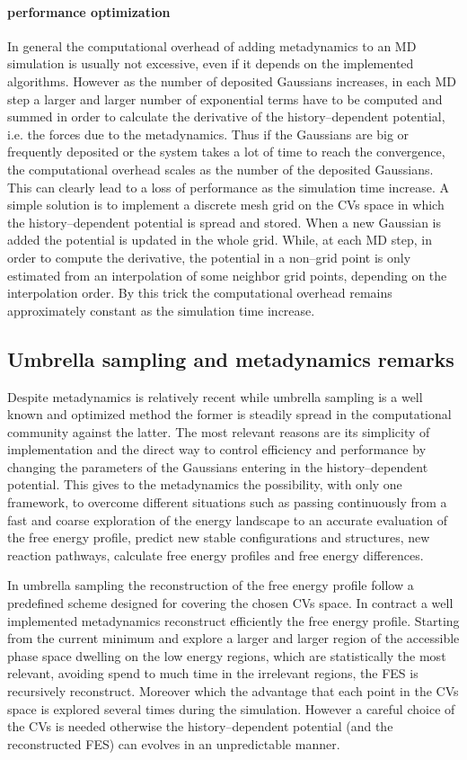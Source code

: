 \paragraph{\textbf{performance optimization}} In general the computational overhead of adding metadynamics to an 
\ac{MD} simulation is usually not excessive, even if it depends on the implemented algorithms. However as the 
number of deposited Gaussians increases, in each \ac{MD} step a larger and larger number of exponential terms 
have to be computed and summed in order to calculate the derivative of the history--dependent potential, i.e. the 
forces due to the metadynamics. Thus if the Gaussians are big or frequently deposited or the system takes a lot 
of time to reach the convergence, the computational overhead scales as the number of the deposited Gaussians. 
This can clearly lead to a loss of performance as the simulation time increase. A simple solution is to implement 
a discrete mesh grid on the \acp{CV} space in which the history--dependent potential is spread and stored. When a 
new Gaussian is added the potential is updated in the whole grid. While, at each \ac{MD} step, in order to 
compute the derivative, the potential in a non--grid point is only estimated from an interpolation of some 
neighbor grid points, depending on the interpolation order. By this trick the computational overhead remains 
approximately constant as the simulation time increase.

\subsection{Umbrella sampling and metadynamics remarks}
Despite metadynamics is relatively recent while umbrella sampling is a well known and optimized method the former is steadily spread in the computational community against the latter. The most relevant reasons are its simplicity of implementation and the direct way to control efficiency and performance by changing the parameters of the Gaussians entering in the history--dependent potential. This gives to the metadynamics the possibility, with only one framework, to overcome different situations such as passing continuously from a fast and coarse exploration of the energy landscape to an accurate evaluation of the free energy profile, predict new stable configurations and structures, new reaction pathways, calculate free energy profiles and free energy differences.

In umbrella sampling the reconstruction of the free energy profile follow a predefined scheme designed for covering the chosen \acp{CV} space. In contract a well implemented metadynamics reconstruct efficiently the free energy profile. Starting from the current minimum and explore a larger and larger region of the accessible phase space dwelling on the low energy regions, which are statistically the most relevant, avoiding spend to much time in the irrelevant regions, the \ac{FES} is recursively reconstruct. Moreover which the advantage that each point in the \acp{CV} space is explored several times during the simulation. However a careful choice of the \acp{CV} is needed otherwise the history--dependent potential (and the reconstructed \ac{FES}) can evolves in an unpredictable manner.   

